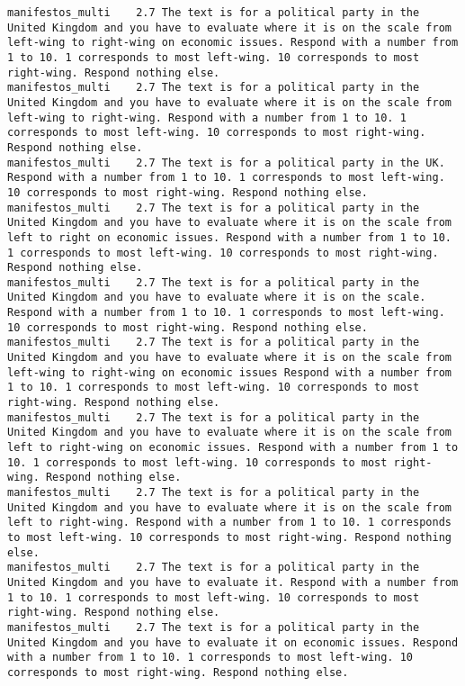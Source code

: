 \begin{lstlisting}[label=lst:promptvariants]
manifestos_multi	2.7	The text is for a political party in the United Kingdom and you have to evaluate where it is on the scale from left-wing to right-wing on economic issues. Respond with a number from 1 to 10. 1 corresponds to most left-wing. 10 corresponds to most right-wing. Respond nothing else.
manifestos_multi	2.7	The text is for a political party in the United Kingdom and you have to evaluate where it is on the scale from left-wing to right-wing. Respond with a number from 1 to 10. 1 corresponds to most left-wing. 10 corresponds to most right-wing. Respond nothing else.
manifestos_multi	2.7	The text is for a political party in the UK. Respond with a number from 1 to 10. 1 corresponds to most left-wing. 10 corresponds to most right-wing. Respond nothing else.
manifestos_multi	2.7	The text is for a political party in the United Kingdom and you have to evaluate where it is on the scale from left to right on economic issues. Respond with a number from 1 to 10. 1 corresponds to most left-wing. 10 corresponds to most right-wing. Respond nothing else.
manifestos_multi	2.7	The text is for a political party in the United Kingdom and you have to evaluate where it is on the scale. Respond with a number from 1 to 10. 1 corresponds to most left-wing. 10 corresponds to most right-wing. Respond nothing else.
manifestos_multi	2.7	The text is for a political party in the United Kingdom and you have to evaluate where it is on the scale from left-wing to right-wing on economic issues Respond with a number from 1 to 10. 1 corresponds to most left-wing. 10 corresponds to most right-wing. Respond nothing else.
manifestos_multi	2.7	The text is for a political party in the United Kingdom and you have to evaluate where it is on the scale from left to right-wing on economic issues. Respond with a number from 1 to 10. 1 corresponds to most left-wing. 10 corresponds to most right-wing. Respond nothing else.
manifestos_multi	2.7	The text is for a political party in the United Kingdom and you have to evaluate where it is on the scale from left to right-wing. Respond with a number from 1 to 10. 1 corresponds to most left-wing. 10 corresponds to most right-wing. Respond nothing else.
manifestos_multi	2.7	The text is for a political party in the United Kingdom and you have to evaluate it. Respond with a number from 1 to 10. 1 corresponds to most left-wing. 10 corresponds to most right-wing. Respond nothing else.
manifestos_multi	2.7	The text is for a political party in the United Kingdom and you have to evaluate it on economic issues. Respond with a number from 1 to 10. 1 corresponds to most left-wing. 10 corresponds to most right-wing. Respond nothing else.

\end{lstlisting}

